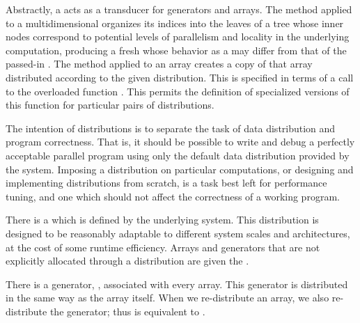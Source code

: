 Abstractly, a  acts as a transducer for generators
and arrays.  The  method applied to a multidimensional
 organizes its indices into the leaves of a tree whose
inner nodes correspond to potential levels of parallelism and locality
in the underlying computation, producing a fresh  whose
behavior as a  may differ from that of the passed-in
.  The  method applied to an array creates
a copy of that array distributed according to the given distribution.
This is specified in terms of a call to the overloaded function
.  This permits the definition of specialized
versions of this function for particular pairs of distributions.

The intention of distributions is to separate the task of data
distribution and program correctness.  That is, it should be possible
to write and debug a perfectly acceptable parallel program using only
the default data distribution provided by the system.  Imposing a
distribution on particular computations, or designing and implementing
distributions from scratch, is a task best left for performance
tuning, and one which should not affect the correctness of a working
program.

There is a  which is defined by the
underlying system.  This distribution is designed to be reasonably
adaptable to different system scales and architectures, at the cost of
some runtime efficiency.  Arrays and generators that are not
explicitly allocated through a distribution are given the
.

There is a generator, ,
associated with every array.  This generator is distributed in the
same way as the array itself.  When we re-distribute an array, we also
re-distribute the generator; thus
 is equivalent to
.

